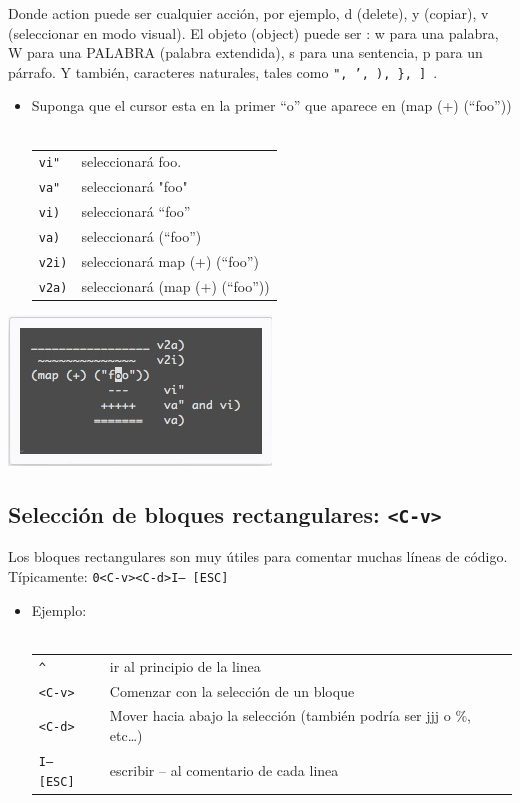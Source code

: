 \documentclass[12pt]{article}
\begin{document}
Donde action puede ser cualquier acción, por ejemplo, d (delete), y (copiar), v (seleccionar en modo visual). El objeto (object) puede ser : w para una palabra, W para una PALABRA (palabra extendida), s para una sentencia, p para un párrafo. Y también, caracteres naturales, tales como \texttt{", ', ), \}, ] }.


\begin{itemize}
	\item Suponga que el cursor esta en la primer ``o'' que aparece en  (map (+) (``foo'')) \\ \\
\begin{tabular}{ l l }
	\texttt{vi"} & seleccionará foo. \\
	\texttt{va"} & seleccionará "foo" \\
	\texttt{vi)} & seleccionará ``foo'' \\
	\texttt{va)} & seleccionará (``foo'') \\
	\texttt{v2i)} & seleccionará map (+) (``foo'') \\
	\texttt{v2a)} & seleccionará (map (+) (``foo'')) \\
\end{tabular}
\end{itemize}


\begin{center}
 \includegraphics{./img/vivisual.jpg}
\end{center}


\subsection{Selección de bloques rectangulares: \texttt{<C-v>}}

Los bloques rectangulares son muy útiles para comentar muchas
líneas de código. Típicamente:  \texttt{0<C-v><C-d>I-- [ESC]}

\begin{itemize}
	\item Ejemplo: \\ \\
\begin{tabular}{ l l }
	\texttt{\^} & ir al principio de la linea \\
	\texttt{<C-v>} & Comenzar con la selección de un bloque \\
	\texttt{<C-d>} & Mover hacia abajo la selección (también podría ser jjj o \%, etc…) \\
	\texttt{I-- [ESC]} & escribir -- al comentario de cada linea \\
\end{tabular}
\end{itemize}
\end{document}
